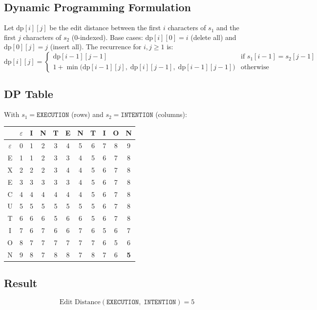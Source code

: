 \documentclass[12pt,a4paper]{article}
\begin{document}
\subsection*{Dynamic Programming Formulation}

Let $\text{dp}[i][j]$ be the edit distance between the first $i$ characters of $s_1$ and the first $j$ characters of $s_2$ (0-indexed). Base cases: $\text{dp}[i][0] = i$ (delete all) and $\text{dp}[0][j] = j$ (insert all). The recurrence for $i, j \ge 1$ is:
\[
    \text{dp}[i][j] = \begin{cases}
        \text{dp}[i-1][j-1] & \text{if } s_1[i-1] = s_2[j-1] \\[4pt]
        1 + \min\!\big(\text{dp}[i-1][j],\; \text{dp}[i][j-1],\; \text{dp}[i-1][j-1]\big) & \text{otherwise}
    \end{cases}
\]

\subsection*{DP Table}

With $s_1 = \texttt{EXECUTION}$ (rows) and $s_2 = \texttt{INTENTION}$ (columns):

\begin{center}
\small
\begin{tabular}{c|cccccccccc}
    & $\varepsilon$ & I & N & T & E & N & T & I & O & N \\ \hline
    $\varepsilon$ & 0 & 1 & 2 & 3 & 4 & 5 & 6 & 7 & 8 & 9 \\
    E & 1 & 1 & 2 & 3 & 3 & 4 & 5 & 6 & 7 & 8 \\
    X & 2 & 2 & 2 & 3 & 4 & 4 & 5 & 6 & 7 & 8 \\
    E & 3 & 3 & 3 & 3 & 3 & 4 & 5 & 6 & 7 & 8 \\
    C & 4 & 4 & 4 & 4 & 4 & 4 & 5 & 6 & 7 & 8 \\
    U & 5 & 5 & 5 & 5 & 5 & 5 & 5 & 6 & 7 & 8 \\
    T & 6 & 6 & 6 & 5 & 6 & 6 & 5 & 6 & 7 & 8 \\
    I & 7 & 6 & 7 & 6 & 6 & 7 & 6 & 5 & 6 & 7 \\
    O & 8 & 7 & 7 & 7 & 7 & 7 & 7 & 6 & 5 & 6 \\
    N & 9 & 8 & 7 & 8 & 8 & 7 & 8 & 7 & 6 & \textbf{5} \\
\end{tabular}
\end{center}

\subsection*{Result}

\[
    \text{Edit Distance}(\texttt{EXECUTION},\; \texttt{INTENTION}) = \boxed{5}
\]
\end{document}
